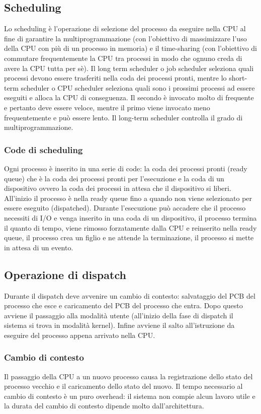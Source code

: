 \subsection{Scheduling}
Lo scheduling \`e l'operazione di selezione del processo da eseguire nella CPU al fine di garantire la multiprogrammazione (con l'obiettivo di massimizzare l'uso della CPU con pi\`u di
un processo in memoria) e il time-sharing (con l'obiettivo di commutare frequentemente la CPU tra processi in modo che ognuno creda di avere la CPU tutta per s\`e). Il long term
scheduler o job scheduler seleziona quali processi devono essere trasferiti nella coda dei processi pronti, mentre lo short-term scheduler o CPU scheduler seleziona quali sono i 
prossimi processi ad essere eseguiti e alloca la CPU di conseguenza. Il secondo \`e invocato molto di frequente e pertanto deve essere veloce, mentre il primo viene invocato meno
frequentemente e pu\`o essere lento. Il long-term scheduler controlla il grado di multiprogrammazione. 
\subsubsection{Code di scheduling}
Ogni processo \`e inserito in una serie di code: la coda dei processi pronti (ready queue) che \`e la coda dei processi pronti per l'esecuzione e la coda di un dispositivo ovvero la
coda dei processi in attesa che il dispositivo si liberi. All'inizio il processo \`e nella ready queue fino a quando non viene selezionato per essere eseguito (dispatched). Durante
l'esecuzione pu\`o accadere che il processo necessiti di I/O e venga inserito in una coda di un dispositivo, il processo termina il quanto di tempo, viene rimosso forzatamente dalla
CPU e reinserito nella ready queue, il processo crea un figlio e ne attende la terminazione, il processo si mette in attesa di un evento. 
\subsection{Operazione di dispatch}
Durante il dispatch deve avvenire un cambio di contesto: salvataggio del PCB del processo che esce e caricamento del PCB del processo che entra. Dopo questo avviene il passaggio alla
modalit\`a utente (all'inizio della fase di dispatch il sistema si trova in modalit\`a kernel). Infine avviene il salto all'istruzione da eseguire del processo appena arrivato nella
CPU.
\subsubsection{Cambio di contesto}
Il passaggio della CPU a un nuovo processo causa la registrazione dello stato del processo vecchio e il caricamento dello stato del nuovo. Il tempo necessario al cambio di contesto 
\`e un puro overhead: il sistema non compie alcun lavoro utile e la durata del cambio di contesto dipende molto dall'architettura.
